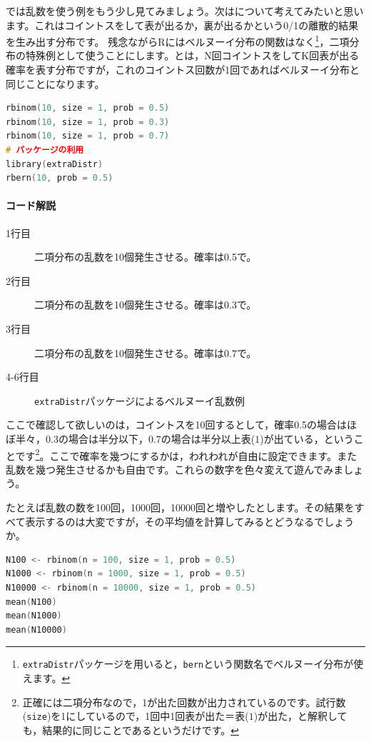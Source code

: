 \documentclass{ltjsbook}
\begin{document}
では乱数を使う例をもう少し見てみましょう。次はについて考えてみたいと思います。これはコイントスをして表が出るか，裏が出るかという0/1の離散的結果を生み出す分布です。
残念ながらRにはベルヌーイ分布の関数はなく\footnote{\texttt{extraDistr}パッケージを用いると，\texttt{bern}という関数名でベルヌーイ分布が使えます。}，二項分布の特殊例として使うことにします。とは，N回コイントスをしてK回表が出る確率を表す分布ですが，これのコイントス回数が1回であればベルヌーイ分布と同じことになります。
\begin{lstlisting}[language=c++,label={code:17_02},caption={乱数のコードの例2}]
rbinom(10, size = 1, prob = 0.5)
rbinom(10, size = 1, prob = 0.3)
rbinom(10, size = 1, prob = 0.7)
# パッケージの利用
library(extraDistr)
rbern(10, prob = 0.5)
\end{lstlisting}
\paragraph{コード解説}
\begin{description}
  \item[1行目] 二項分布の乱数を10個発生させる。確率は0.5で。
  \item[2行目] 二項分布の乱数を10個発生させる。確率は0.3で。
  \item[3行目] 二項分布の乱数を10個発生させる。確率は0.7で。
  \item[4-6行目] \texttt{extraDistr}パッケージによるベルヌーイ乱数例
\end{description}

ここで確認して欲しいのは，コイントスを10回するとして，確率0.5の場合はほぼ半々，0.3の場合は半分以下，0.7の場合は半分以上表($1$)が出ている，ということです\footnote{正確には二項分布なので，1が出た回数が出力されているのです。試行数(\texttt{size})を1にしているので，1回中1回表が出た＝表($1$)が出た，と解釈しても，結果的に同じことであるというだけです。}。ここで確率を幾つにするかは，われわれが自由に設定できます。また乱数を幾つ発生させるかも自由です。これらの数字を色々変えて遊んでみましょう。

たとえば乱数の数を100回，1000回，10000回と増やしたとします。その結果をすべて表示するのは大変ですが，その平均値を計算してみるとどうなるでしょうか。
\begin{lstlisting}[language=c++,label={code:17_03},caption={乱数のコードの例3}]
N100 <- rbinom(n = 100, size = 1, prob = 0.5)
N1000 <- rbinom(n = 1000, size = 1, prob = 0.5)
N10000 <- rbinom(n = 10000, size = 1, prob = 0.5)
mean(N100)
mean(N1000)
mean(N10000)
\end{lstlisting}
\end{document}
